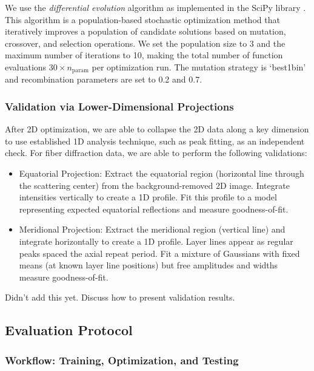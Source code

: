 \documentclass[iucr,review]{iucrjournals}
\begin{document}
We use the \emph{differential evolution} algorithm \cite{StornPrice1997} as implemented in the SciPy library \cite{SciPy2020}.
This algorithm is a population-based stochastic optimization method that
iteratively improves a population of candidate solutions based on mutation, crossover, and selection operations.
We set the population size to 3 and the maximum number of iterations to 10, making the total
number of function evaluations $30 \times n_{\mathrm{param}}$ per optimization run.
The mutation strategy is `best1bin' and recombination parameters are set to 0.2 and 0.7.


\subsubsection{Validation via Lower-Dimensional Projections}

After 2D optimization, we are able to collapse the 2D data along a key dimension to use established 1D analysis technique,
such as peak fitting, 
as an independent check. For fiber diffraction data, we are able to perform the following validations: 
\begin{itemize}
        \item Equatorial Projection: Extract the equatorial region (horizontal line through the scattering center)
        from the background-removed 2D image. Integrate intensities vertically to create a 1D profile.
        Fit this profile to a model representing expected equatorial reflections and measure goodness-of-fit.
        \item Meridional Projection: Extract the meridional region (vertical line) and integrate horizontally to create a 1D profile.
        Layer lines appear as regular peaks spaced the axial repeat period.
        Fit a mixture of Gaussians with fixed means (at known layer line positions) but free amplitudes and widths measure goodness-of-fit.
\end{itemize}

\colorbox{SkyBlue!20}{Didn't add this yet. Discuss how to present validation results.}

\subsection{Evaluation Protocol}
\subsubsection{Workflow: Training, Optimization, and Testing}
\end{document}
